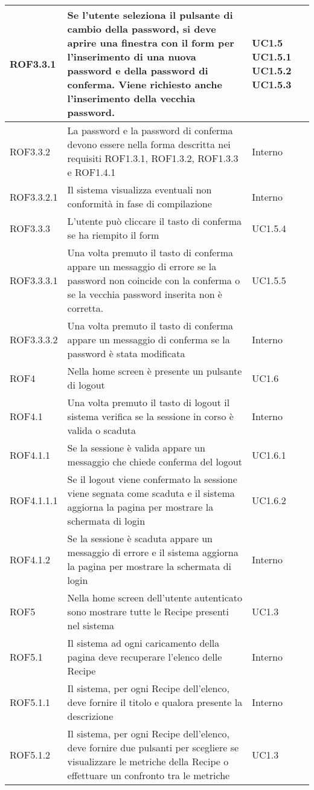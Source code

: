 \begin{center}
\begin{longtable}{| p{2.5cm} | p{8cm} | p{2cm} |}
		\hline
		ROF3.3.1  &  Se l'utente seleziona il pulsante di cambio della password, si deve aprire una finestra con il form per l'inserimento di una nuova password e della password di conferma. Viene richiesto anche l'inserimento della vecchia password. &  UC1.5 \newline UC1.5.1 \newline UC1.5.2 \newline UC1.5.3 \\
		\hline
		ROF3.3.2  &  La password e la password di conferma devono essere nella forma descritta nei requisiti ROF1.3.1, ROF1.3.2, ROF1.3.3 e ROF1.4.1  &  Interno \\
		\hline
		ROF3.3.2.1  &  Il sistema visualizza eventuali non conformità in fase di compilazione  &  Interno \\
		\hline
		ROF3.3.3  &  L'utente può cliccare il tasto di conferma se ha riempito il form  &  UC1.5.4 \\
		\hline
		ROF3.3.3.1  &  Una volta premuto il tasto di conferma appare un messaggio di errore se la password non coincide con la conferma o se la vecchia password inserita non è corretta.  &  UC1.5.5 \\
		\hline
		ROF3.3.3.2  &  Una volta premuto il tasto di conferma appare un messaggio di conferma se la password è stata modificata  &  Interno \\


		\hline
		ROF4  &  Nella home screen è presente un pulsante di logout  &  UC1.6 \\
		\hline
		ROF4.1  &  Una volta premuto il tasto di logout il sistema verifica se la sessione in corso è valida o scaduta  &  Interno \\
		\hline
		ROF4.1.1  &  Se la sessione è valida appare un messaggio che chiede conferma del logout  &  UC1.6.1 \\
		\hline
		ROF4.1.1.1  &  Se il logout viene confermato la sessione viene segnata come scaduta e il sistema aggiorna la pagina per mostrare la schermata di login  &  UC1.6.2 \\
		\hline
		ROF4.1.2  &  Se la sessione è scaduta appare un messaggio di errore e il sistema aggiorna la pagina per mostrare la schermata di login  &  Interno \\



		\hline
		ROF5  &  Nella home screen dell'utente autenticato sono mostrare tutte le Recipe presenti nel sistema &  UC1.3 \\
		\hline
		ROF5.1  & Il sistema ad ogni caricamento della pagina deve recuperare l'elenco delle Recipe  &  Interno \\
		\hline
		ROF5.1.1  & Il sistema, per ogni Recipe dell'elenco, deve fornire il titolo e qualora presente la descrizione  &  Interno \\
		\hline
		ROF5.1.2  & Il sistema, per ogni Recipe dell'elenco, deve fornire due pulsanti per scegliere se visualizzare le metriche della Recipe o effettuare un confronto tra le metriche &  UC1.3 \\


\end{longtable}
\end{center}
